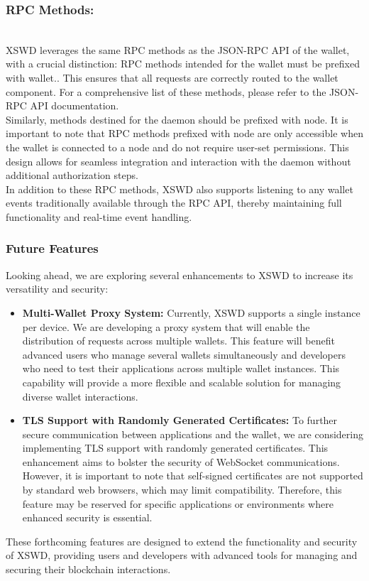 \documentclass[12pt,a4paper,twocolumn]{article}
\begin{document}
\subsubsection{RPC Methods:}\\

XSWD leverages the same RPC methods as the JSON-RPC API of the wallet, with a crucial distinction: RPC methods intended for the wallet must be prefixed with wallet.. This ensures that all requests are correctly routed to the wallet component. For a comprehensive list of these methods, please refer to the JSON-RPC API documentation.\\

Similarly, methods destined for the daemon should be prefixed with node. It is important to note that RPC methods prefixed with node are only accessible when the wallet is connected to a node and do not require user-set permissions. This design allows for seamless integration and interaction with the daemon without additional authorization steps.\\

In addition to these RPC methods, XSWD also supports listening to any wallet events traditionally available through the RPC API, thereby maintaining full functionality and real-time event handling.

\subsubsection{Future Features}

Looking ahead, we are exploring several enhancements to XSWD to increase its versatility and security:\\

\begin{itemize}
\item \textbf{Multi-Wallet Proxy System:} Currently, XSWD supports a single instance per device. We are developing a proxy system that will enable the distribution of requests across multiple wallets. This feature will benefit advanced users who manage several wallets simultaneously and developers who need to test their applications across multiple wallet instances. This capability will provide a more flexible and scalable solution for managing diverse wallet interactions.

\item \textbf{TLS Support with Randomly Generated Certificates:} To further secure communication between applications and the wallet, we are considering implementing TLS support with randomly generated certificates. This enhancement aims to bolster the security of WebSocket communications. However, it is important to note that self-signed certificates are not supported by standard web browsers, which may limit compatibility. Therefore, this feature may be reserved for specific applications or environments where enhanced security is essential.\\
\end{itemize}
These forthcoming features are designed to extend the functionality and security of XSWD, providing users and developers with advanced tools for managing and securing their blockchain interactions.
\end{document}
